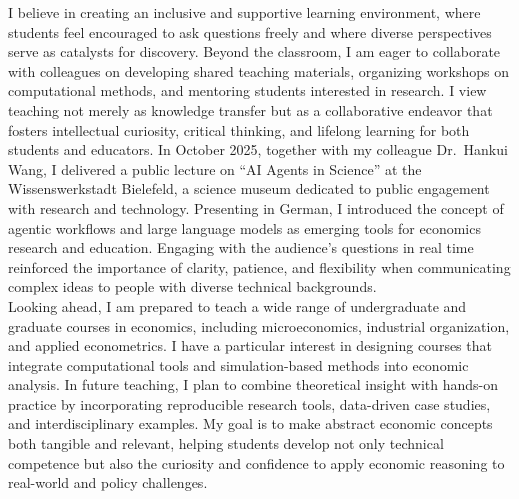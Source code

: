 \documentclass{nfr}
\begin{document}
I believe in creating an inclusive and supportive learning environment, where students feel encouraged to ask questions freely and where diverse perspectives serve as catalysts for discovery. Beyond the classroom, I am eager to collaborate with colleagues on developing shared teaching materials, organizing workshops on computational methods, and mentoring students interested in research. I view teaching not merely as knowledge transfer but as a collaborative endeavor that fosters intellectual curiosity, critical thinking, and lifelong learning for both students and educators. In October 2025, together with my colleague Dr.~Hankui Wang, I delivered a public lecture on “AI Agents in Science” at the Wissenswerkstadt Bielefeld, a science museum dedicated to public engagement with research and technology. Presenting in German, I introduced the concept of agentic workflows and large language models as emerging tools for economics research and education. Engaging with the audience’s questions in real time reinforced the importance of clarity, patience, and flexibility when communicating complex ideas to people with diverse technical backgrounds.\\

Looking ahead, I am prepared to teach a wide range of undergraduate and graduate courses in economics, including microeconomics, industrial organization, and applied econometrics. I have a particular interest in designing courses that integrate computational tools and simulation-based methods into economic analysis. In future teaching, I plan to combine theoretical insight with hands-on practice by incorporating reproducible research tools, data-driven case studies, and interdisciplinary examples. My goal is to make abstract economic concepts both tangible and relevant, helping students develop not only technical competence but also the curiosity and confidence to apply economic reasoning to real-world and policy challenges.
\end{document}
